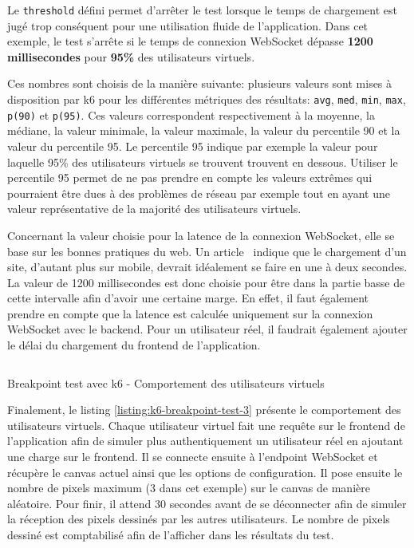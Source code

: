 Le \texttt{threshold} défini permet d'arrêter le test lorsque le temps de chargement est jugé trop conséquent pour une utilisation fluide de l'application. Dans cet exemple, le test s'arrête si le temps de connexion WebSocket dépasse \textbf{1200 millisecondes} pour \textbf{95\%} des utilisateurs virtuels.

Ces nombres sont choisis de la manière suivante: plusieurs valeurs sont mises à disposition par k6 pour les différentes métriques des résultats: \texttt{avg}, \texttt{med}, \texttt{min}, \texttt{max}, \texttt{p(90)} et \texttt{p(95)}. Ces valeurs correspondent respectivement à la moyenne, la médiane, la valeur minimale, la valeur maximale, la valeur du percentile 90 et la valeur du percentile 95. Le percentile 95 indique par exemple la valeur pour laquelle 95\% des utilisateurs virtuels se trouvent trouvent en dessous. Utiliser le percentile 95 permet de ne pas prendre en compte les valeurs extrêmes qui pourraient être dues à des problèmes de réseau par exemple tout en ayant une valeur représentative de la majorité des utilisateurs virtuels.

Concernant la valeur choisie pour la latence de la connexion WebSocket, elle se base sur les bonnes pratiques du web. Un article~\cite{how-fast-should-a-website-load-in-2023} indique que le chargement d'un site, d'autant plus sur mobile, devrait idéalement se faire en une à deux secondes. La valeur de 1200 millisecondes est donc choisie pour être dans la partie basse de cette intervalle afin d'avoir une certaine marge. En effet, il faut également prendre en compte que la latence est calculée uniquement sur la connexion WebSocket avec le backend. Pour un utilisateur réel, il faudrait également ajouter le délai du chargement du frontend de l'application.

\begin{listing}[H]
  \inputminted[linenos]{ts}{assets/figures/breakpoint-test-3.ts}
  \caption{Breakpoint test avec k6 - Comportement des utilisateurs virtuels}
  \label{listing:k6-breakpoint-test-3}
\end{listing}

Finalement, le listing \ref{listing:k6-breakpoint-test-3} présente le comportement des utilisateurs virtuels. Chaque utilisateur virtuel fait une requête sur le frontend de l'application afin de simuler plus authentiquement un utilisateur réel en ajoutant une charge sur le frontend. Il se connecte ensuite à l'endpoint WebSocket et récupère le canvas actuel ainsi que les options de configuration. Il pose ensuite le nombre de pixels maximum (3 dans cet exemple) sur le canvas de manière aléatoire. Pour finir, il attend 30 secondes avant de se déconnecter afin de simuler la réception des pixels dessinés par les autres utilisateurs. Le nombre de pixels dessiné est comptabilisé afin de l'afficher dans les résultats du test.

